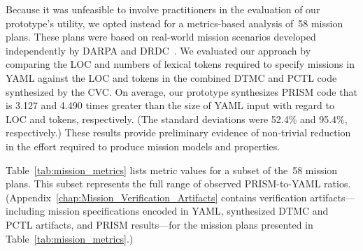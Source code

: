 Because it was unfeasible to involve practitioners in the evaluation of our prototype's utility, we opted instead for a metrics-based analysis of~58 mission plans. These plans were based on real-world mission scenarios developed independently by DARPA and DRDC~\cite{DARPA,Youngson_2004}. We evaluated our approach by comparing the LOC and numbers of lexical tokens required to specify missions in YAML against the LOC and tokens in the combined DTMC and PCTL code synthesized by the CVC\@. On average, our prototype synthesizes PRISM code that is 3.127 and 4.490 times greater than the size of YAML input with regard to LOC and tokens, respectively. (The standard deviations were 52.4\% and 95.4\%, respectively.) These results provide preliminary evidence of non-trivial reduction in the effort required to produce mission models and properties.

Table~\ref{tab:mission_metrics} lists metric values for a subset of the~58 mission plans. This subset represents the full range of observed PRISM-to-YAML ratios. (Appendix~\ref{chap:Mission_Verification_Artifacts} contains verification artifacts---including mission specifications encoded in YAML, synthesized DTMC and PCTL artifacts, and PRISM results---for the mission plans presented in Table~\ref{tab:mission_metrics}.)

